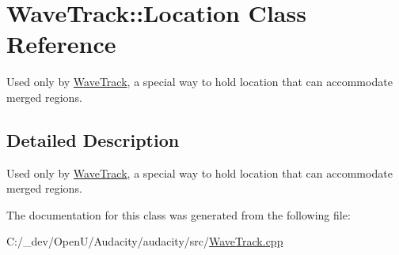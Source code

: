 \hypertarget{class_wave_track_1_1_location}{}\section{Wave\+Track\+:\+:Location Class Reference}
\label{class_wave_track_1_1_location}


Used only by \hyperlink{class_wave_track}{Wave\+Track}, a special way to hold location that can accommodate merged regions.  




\subsection{Detailed Description}
Used only by \hyperlink{class_wave_track}{Wave\+Track}, a special way to hold location that can accommodate merged regions. 

The documentation for this class was generated from the following file\+:\begin{DoxyCompactItemize}
\item 
C\+:/\+\_\+dev/\+Open\+U/\+Audacity/audacity/src/\hyperlink{_wave_track_8cpp}{Wave\+Track.\+cpp}\end{DoxyCompactItemize}
